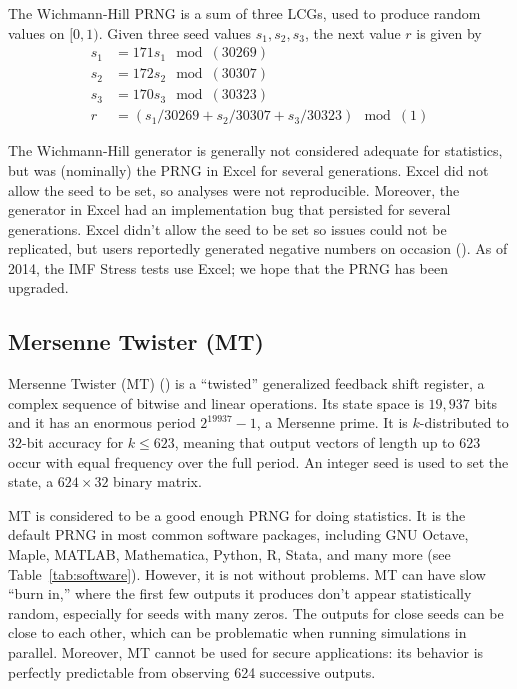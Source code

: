\documentclass[graybox]{svmult}
\newcommand{\todo}[1]{{\color{red}{TO DO: \sc #1}}}
\begin{document}
The Wichmann-Hill PRNG is a sum of three LCGs, used to produce random values on $[0, 1)$.
Given three seed values $s_1, s_2, s_3$, the next value $r$ is given by
\begin{align*}
s_1 &= 171 s_1\mod(30269) \\
s_2 &= 172 s_2 \mod(30307) \\
s_3 &= 170 s_3 \mod(30323) \\
r &= (s_1/30269 + s_2/30307 + s_3/30323) \mod(1)
\end{align*}

The Wichmann-Hill generator is generally not considered adequate for statistics, but was (nominally) the PRNG in Excel for several generations. 
Excel did not allow the seed to be set, so analyses were not reproducible.
Moreover, the generator in Excel had an implementation bug that persisted for several generations.
Excel didn't allow the seed to be set so issues could not be replicated, but users reportedly generated negative numbers on occasion (\cite{mccullough_microsoft_2008}).
As of 2014, the IMF Stress tests use Excel; we hope that the PRNG has been upgraded.
\todo{cite this}

\subsection{Mersenne Twister (MT)}

Mersenne Twister (MT) (\cite{matsumoto_mersenne_1998}) is a ``twisted'' generalized feedback shift register, a complex sequence of bitwise and linear operations.
Its state space is $19,937$ bits and it has an enormous period $2^{19937}-1$, a Mersenne prime.
It is $k$-distributed to $32$-bit accuracy for $k \leq 623$, meaning that output vectors of length up to $623$ occur with equal frequency over the full period.
An integer seed is used to set the state, a $624 \times 32$ binary matrix.

MT is considered to be a good enough PRNG for doing statistics.
It is the default PRNG in most common software packages, including GNU Octave, Maple, MATLAB, Mathematica, Python, R, Stata, and many more (see Table~\ref{tab:software}).
However, it is not without problems.
MT can have slow ``burn in,'' where the first few outputs it produces don't appear statistically random, especially for seeds with many zeros. \todo{CITE}
The outputs for close seeds can be close to each other, which can be problematic when running simulations in parallel. 
Moreover, MT cannot be used for secure applications: its behavior is perfectly predictable from observing 624 successive outputs.
\end{document}
